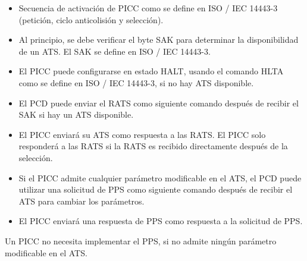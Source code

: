 \begin{itemize}
	\item Secuencia de activación de PICC como se define en ISO / IEC 14443-3 (petición, ciclo anticolisión y selección).\par

	\item Al principio, se debe verificar el byte SAK para determinar la disponibilidad de un ATS. El SAK se define en ISO / IEC 14443-3.\par

	\item El PICC puede configurarse en estado HALT, usando el comando HLTA como se define en ISO / IEC 14443-3, si no hay ATS disponible.\par

	\item El PCD puede enviar el RATS como siguiente comando después de recibir el SAK si hay un ATS disponible.\par

	\item El PICC enviará su ATS como respuesta a las RATS. El PICC solo responderá a las RATS si la RATS es recibido directamente después de la selección.\par

	\item Si el PICC admite cualquier parámetro modificable en el ATS, el PCD puede utilizar una solicitud de PPS como siguiente comando después de recibir el ATS para cambiar los parámetros.\par

	\item El PICC enviará una respuesta de PPS como respuesta a la solicitud de PPS.
\end{itemize}\par

Un PICC no necesita implementar el PPS, si no admite ningún parámetro modificable en el ATS.\par




